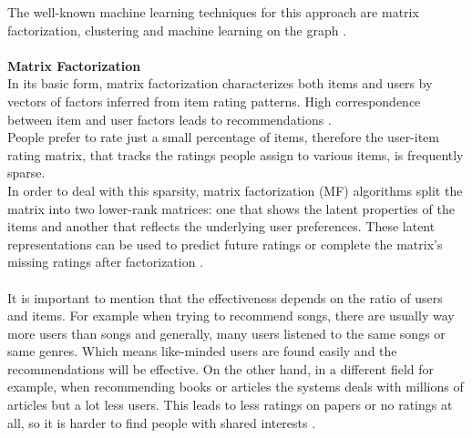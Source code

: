 \documentclass[\myFontSize,a4paper,oneside,hidelinks]{article}
\begin{document}
The well-known machine learning techniques for this approach are matrix factorization, clustering and machine learning on the graph \cite{NILASHI2018507}. \\\\
%
%
%
\textbf{Matrix Factorization}\\
In its basic form, matrix factorization characterizes both items and users by vectors of factors inferred from item rating patterns. High correspondence between item and user factors leads to recommendations \cite{5197422}. \\
People prefer to rate just a small percentage of items, therefore the user-item rating matrix, that tracks the ratings people assign to various items, is frequently sparse.\\
In order to deal with this sparsity, matrix factorization (MF) algorithms split the matrix into two lower-rank matrices: one that shows the latent properties of the items and another that reflects the underlying user preferences. These latent representations can be used to predict future ratings or complete the matrix's missing ratings after factorization \cite{Tokala2023}.\\\\
%
%
%
It is important to mention that the effectiveness depends on the ratio of users and items. For example when trying to recommend songs, there are usually way more users than songs and generally, many users listened to the same songs or same genres. Which means like-minded users are found easily and the recommendations will be effective. On the other hand, in a different field for example, when recommending books or articles the systems deals with millions of articles but a lot less users. This leads to less ratings on papers or no ratings at all, so it is harder to find people with shared interests \cite{Beel2016305}.\\
\end{document}
